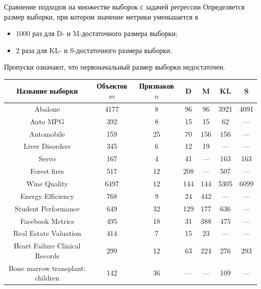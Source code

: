 \documentclass[aspectratio=169]{beamer}
\begin{document}
\begin{frame}{Сравнение подходов на множестве выборок с задачей регрессии}
    \vspace{-0.3cm}
    Определяется размер выборки, при котором значение метрики уменьшается в 
    \vspace{-0.25cm}
    \begin{itemize}
        \item 1000 раз для D- и M-достаточного размера выборки;
        \item 2 раза для KL- и S-достаточного размера выборки.
    \end{itemize}
    \vspace{-0.1cm}
    Пропуски означают, что первоначальный размер выборки недостаточен.
    \vspace{-0.3cm}
    \scriptsize
    \begin{table}
        \begin{tabular}{ccccccc}
        \toprule
        Название выборки & Объектов $m$ & Признаков $n$ & D & M & KL & S \\
        \midrule
        Abalone & 4177 & 8 & 96 & 96 & 3921 & 4091 \\
        Auto MPG & 392 & 8 & 15 & 15 & 62 & --- \\
        Automobile & 159 & 25 & 70 & 156 & 156 & --- \\
        Liver Disorders & 345 & 6 & 12 & 19 & --- & --- \\
        Servo & 167 & 4 & 41 & --- & 163 & 163 \\
        Forest fires & 517 & 12 & 208 & --- & 507 & --- \\
        Wine Quality & 6497 & 12 & 144 & 144 & 5305 & 6099 \\
        Energy Efficiency & 768 & 9 & 24 & 442 & --- & --- \\
        Student Performance & 649 & 32 & 129 & 177 & 636 & --- \\
        Facebook Metrics & 495 & 18 & 31 & 388 & 475 & ---  \\
        Real Estate Valuation & 414 & 7 & 15 & 23 & --- & --- \\
        Heart Failure Clinical Records & 299 & 12 & 63 & 224 & 276 & 293 \\
        Bone marrow transplant: children & 142 & 36 & --- & --- & 109 & --- \\
        \bottomrule
        \end{tabular}
    \end{table}
\end{frame}
\end{document}
